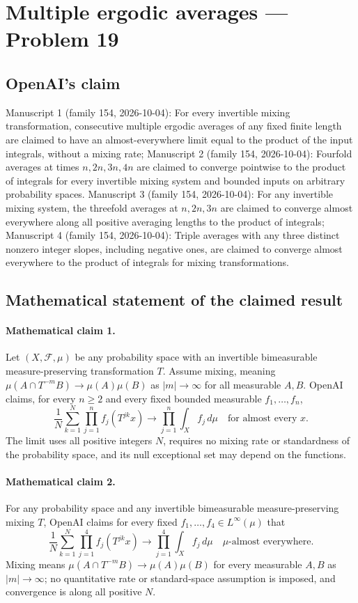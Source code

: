 \documentclass[11pt]{article}
\begin{document}
\section*{Multiple ergodic averages — Problem 19}

\subsection{OpenAI's claim}
Manuscript 1 (family 154, 2026-10-04): For every invertible mixing transformation, consecutive multiple ergodic averages of any fixed finite length are claimed to have an almost-everywhere limit equal to the product of the input integrals, without a mixing rate; Manuscript 2 (family 154, 2026-10-04): Fourfold averages at times $n,2n,3n,4n$ are claimed to converge pointwise to the product of integrals for every invertible mixing system and bounded inputs on arbitrary probability spaces. Manuscript 3 (family 154, 2026-10-04): For any invertible mixing system, the threefold averages at $n,2n,3n$ are claimed to converge almost everywhere along all positive averaging lengths to the product of integrals; Manuscript 4 (family 154, 2026-10-04): Triple averages with any three distinct nonzero integer slopes, including negative ones, are claimed to converge almost everywhere to the product of integrals for mixing transformations.

\subsection{Mathematical statement of the claimed result}
\paragraph{Mathematical claim 1.} Let $(X,\mathcal F,\mu)$ be any probability space with an invertible bimeasurable measure-preserving transformation $T$. Assume mixing, meaning $\mu(A\cap T^{-m}B)\to\mu(A)\mu(B)$ as $|m|\to\infty$ for all measurable $A,B$. OpenAI claims, for every $n\ge2$ and every fixed bounded measurable $f_1,\ldots,f_n$,
\[
\frac1N\sum_{k=1}^N\prod_{j=1}^n f_j(T^{jk}x)\longrightarrow\prod_{j=1}^n\int_X f_j\,d\mu
\quad\text{for almost every }x.
\]
The limit uses all positive integers $N$, requires no mixing rate or standardness of the probability space, and its null exceptional set may depend on the functions.

\paragraph{Mathematical claim 2.} For any probability space and any invertible bimeasurable measure-preserving mixing $T$, OpenAI claims for every fixed $f_1,\ldots,f_4\in L^\infty(\mu)$ that
\[
\frac1N\sum_{k=1}^N\prod_{j=1}^4 f_j(T^{jk}x)\longrightarrow\prod_{j=1}^4\int_X f_j\,d\mu
\quad\mu\text{-almost everywhere}.
\]
Mixing means $\mu(A\cap T^{-m}B)\to\mu(A)\mu(B)$ for every measurable $A,B$ as $|m|\to\infty$; no quantitative rate or standard-space assumption is imposed, and convergence is along all positive $N$.
\end{document}
